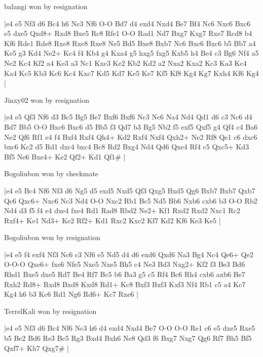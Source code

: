 \showboard

balangi won by resignation

\makegametitle
|e4 e5 Nf3 d6 Bc4 h6 Nc3 Nf6 O-O Bd7 d4 exd4 Nxd4 Be7 Bf4 Nc6 Nxc6 Bxc6 e5 dxe5 Qxd8+ Rxd8 Bxe5 Rc8 Rfe1 O-O Rad1 Nd7 Bxg7 Kxg7 Rxe7 Rcd8 b4 Kf6 Rde1 Rde8 Rxe8 Rxe8 Rxe8 Ne5 Bd5 Bxe8 Bxb7 Nc6 Bxc6 Bxc6 b5 Bb7 a4 Ke5 g3 Kd4 Ne2+ Kc4 f4 Kb4 g4 Kxa4 g5 hxg5 fxg5 Kxb5 h4 Be4 c3 Bg6 Nf4 a5 Ne2 Kc4 Kf2 a4 Ke3 a3 Nc1 Kxc3 Ke2 Kb2 Kd2 a2 Nxa2 Kxa2 Kc3 Ka3 Kc4 Ka4 Kc5 Kb3 Kc6 Kc4 Kxc7 Kd5 Kd7 Ke5 Ke7 Kf5 Kf8 Kg4 Kg7 Kxh4 Kf6 Kg4  |

\showboard

Jinxy02 won by resignation

\makegametitle
|e4 e5 Qf3 Nf6 d3 Bc5 Bg5 Be7 Bxf6 Bxf6 Nc3 Nc6 Na4 Nd4 Qd1 d6 c3 Nc6 d4 Bd7 Bb5 O-O Bxc6 Bxc6 d5 Bb5 f3 Qd7 b3 Bg5 Nb2 f5 exf5 Qxf5 g4 Qf4 c4 Ba6 Ne2 Qf6 Rf1 e4 f4 Bxf4 Rxf4 Qh4+ Kd2 Rxf4 Nxf4 Qxh2+ Ne2 Rf8 Qe1 c6 dxc6 bxc6 Kc2 d5 Rd1 dxc4 bxc4 Bc8 Rd2 Bxg4 Nd4 Qd6 Qxe4 Rf4 c5 Qxc5+ Kd3 Bf5 Ne6 Bxe4+ Ke2 Qf2+ Kd1 Qf1\#  |

\showboard

Bogoliubon won by checkmate

\makegametitle
|e4 e5 Bc4 Nf6 Nf3 d6 Ng5 d5 exd5 Nxd5 Qf3 Qxg5 Bxd5 Qg6 Bxb7 Bxb7 Qxb7 Qc6 Qxc6+ Nxc6 Nc3 Nd4 O-O Nxc2 Rb1 Bc5 Nd5 Bb6 Nxb6 cxb6 b3 O-O Rb2 Nd4 d3 f5 f4 e4 dxe4 fxe4 Rd1 Rad8 Rbd2 Ne2+ Kf1 Rxd2 Rxd2 Nxc1 Rc2 Rxf4+ Ke1 Nd3+ Ke2 Rf2+ Kd1 Rxc2 Kxc2 Kf7 Kd2 Kf6 Ke3 Ke5  |

\showboard

Bogoliubon won by resignation

\makegametitle
|e4 e5 f4 exf4 Nf3 Nc6 c3 Nf6 e5 Nd5 d4 d6 exd6 Qxd6 Na3 Bg4 Nc4 Qe6+ Qe2 O-O-O Qxe6+ fxe6 Nfe5 Nxe5 Nxe5 Bh5 c4 Ne3 Bd3 Nxg2+ Kf2 f3 Be3 Bd6 Rhd1 Bxe5 dxe5 Rd7 Be4 Rf7 Bc5 b6 Ba3 g5 c5 Rf4 Bc6 Rh4 cxb6 axb6 Be7 Rxh2 Rd8+ Rxd8 Bxd8 Kxd8 Rd1+ Kc8 Bxf3 Bxf3 Kxf3 Nf4 Rb1 c5 a4 Kc7 Kg4 h6 b3 Kc6 Rd1 Ng6 Rd6+ Kc7 Rxe6  |

\showboard

TerrelKali won by resignation

\makegametitle
|e4 e5 Nf3 d6 Bc4 Nf6 Nc3 h6 d4 exd4 Nxd4 Be7 O-O O-O Re1 c6 e5 dxe5 Rxe5 b5 Be2 Bd6 Re3 Bc5 Rg3 Bxd4 Bxh6 Ne8 Qd3 f6 Bxg7 Nxg7 Qg6 Rf7 Bh5 Bf5 Qxf7+ Kh7 Qxg7\#  |

